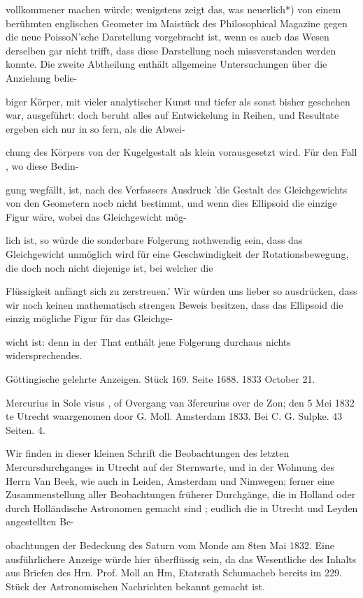 \documentclass[10pt,a4paper]{article}
\begin{document}
vollkommener machen würde; wenigstens zeigt das, was neuerlich*) von einem berühmten englischen Geometer im Maistück des Philosophical Magazine gegen die neue PoissoN'sche Darstellung vorgebracht ist, wenn es aucb das Wesen derselben gar nicht trifft, dass diese Darstellung noch missverstanden werden konnte. Die zweite Abtheilung enthält allgemeine Untersuchungen über die Anziehung belie-

biger Körper, mit vieler analytischer Kunst und tiefer als sonst bisher geschehen war, ausgeführt: doch beruht alles auf Entwickelung in Reihen, und Resultate ergeben sich nur in so fern, als die Abwei-

chung des Körpers von der Kugelgestalt als klein vorausgesetzt wird. Für den Fall , wo diese Bedin-

gung wegfällt, ist, nach des Verfassers Ausdruck 'die Gestalt des Gleichgewichts von den Geometern nocb nicht bestimmt, und wenn dies Ellipsoid die einzige Figur wäre, wobei das Gleichgewicht mög-

lich ist, so würde die sonderbare Folgerung nothwendig sein, dass das Gleichgewicht unmöglich wird für eine Geschwindigkeit der Rotationsbewegung, die doch noch nicht diejenige ist, bei welcher die

Flüssigkeit anfängt sich zu zerstreuen.' Wir würden uns lieber so ausdrücken, dass wir noch keinen mathematisch strengen Beweis besitzen, dass das Ellipsoid die einzig mögliche Figur für das Gleichge-

wicht ist: denn in der That enthält jene Folgerung durchaus nichts widersprechendes.

Göttingische gelehrte Anzeigen. Stück 169. Seite 1688. 1833 October 21.

Mercurius in Sole visus , of Overgang van 3fercurius over de Zon; den 5 Mei 1832 te Utrecht waargenomen door G. Moll. Amsterdam 1833. Bei C. G. Sulpke. 43 Seiten. 4.

Wir finden in dieser kleinen Schrift die Beobachtungen des letzten Mercursdurchganges in Utrecht auf der Sternwarte, und in der Wohnung des Herrn Van Beek, wie auch in Leiden, Amsterdam und Nimwegen; ferner eine Zusammenstellung aller Beobachtungen früherer Durchgänge, die in Holland oder durch Holländische Astronomen gemacht sind ; eudlich die in Utrecht und Leyden angestellten Be-

obachtungen der Bedeckung des Saturn vom Monde am 8ten Mai 1832. Eine ausführlichere Anzeige würde hier überflüssig sein, da das Wesentliche des Inhalts aus Briefen des Hrn. Prof. Moll an Hm, Etatsrath Schumacheb bereits im 229. Stück der Astronomischen Nachrichten bekannt gemacht ist.
\end{document}

